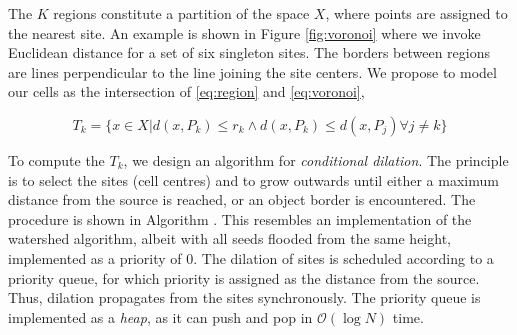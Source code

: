 The $K$ regions constitute a partition of the space $X$, where points are assigned to the nearest site. An example is shown in Figure \ref{fig:voronoi} where we invoke Euclidean distance for a set of six singleton sites. The borders between regions are lines perpendicular to the line joining the site centers. We propose to model our cells as the intersection of \ref{eq:region} and \ref{eq:voronoi},

\begin{equation}
T_k = \Big\{x \in X | d(x, P_k) \leq r_k \land d(x, P_k) \leq d(x, P_j) \forall j \neq k \Big\}
\label{eq:conditional_dilation}
\end{equation}


To compute the $T_k$, we design an algorithm for \emph{conditional dilation}. The principle is to select the sites (cell centres) and to grow outwards until either a maximum distance from the source is reached, or an object border is encountered. The procedure is shown in Algorithm \label{alg:ConditionalDilation}. This resembles an implementation of the watershed algorithm, albeit with all seeds flooded from the same height, implemented as a priority of $0$. The dilation of sites is scheduled according to a priority queue, for which priority is assigned as the distance from the source. Thus, dilation propagates from the sites synchronously. The priority queue is implemented as a \emph{heap}, as it can push and pop in $\mathcal{O}(\log N)$ time.

